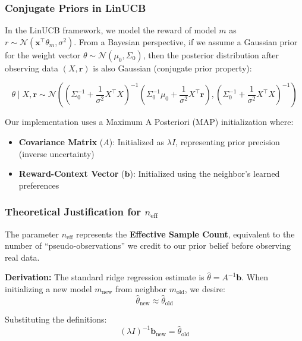 \documentclass[sigconf,nonacm]{acmart}
\begin{document}
\subsubsection{Conjugate Priors in LinUCB}

In the LinUCB framework, we model the reward of model $m$ as $r \sim \mathcal{N}(\mathbf{x}^\top \theta_m, \sigma^2)$. From a Bayesian perspective, if we assume a Gaussian prior for the weight vector $\theta \sim \mathcal{N}(\mu_0, \Sigma_0)$, then the posterior distribution after observing data $(X, \mathbf{r})$ is also Gaussian (conjugate prior property):

\begin{equation}
\theta \mid X, \mathbf{r} \sim \mathcal{N}\left( \left(\Sigma_0^{-1} + \frac{1}{\sigma^2} X^\top X\right)^{-1} \left(\Sigma_0^{-1}\mu_0 + \frac{1}{\sigma^2} X^\top \mathbf{r}\right), \left(\Sigma_0^{-1} + \frac{1}{\sigma^2} X^\top X\right)^{-1} \right)
\end{equation}

Our implementation uses a Maximum A Posteriori (MAP) initialization where:
\begin{itemize}
    \item \textbf{Covariance Matrix} ($A$): Initialized as $\lambda I$, representing prior precision (inverse uncertainty)
    \item \textbf{Reward-Context Vector} ($\mathbf{b}$): Initialized using the neighbor's learned preferences
\end{itemize}

\subsubsection{Theoretical Justification for $n_{\text{eff}}$}

The parameter $n_{\text{eff}}$ represents the \textbf{Effective Sample Count}, equivalent to the number of ``pseudo-observations'' we credit to our prior belief before observing real data.

\textbf{Derivation:} The standard ridge regression estimate is $\hat{\theta} = A^{-1}\mathbf{b}$. When initializing a new model $m_{\text{new}}$ from neighbor $m_{\text{old}}$, we desire:
\begin{equation}
\hat{\theta}_{\text{new}} \approx \hat{\theta}_{\text{old}}
\end{equation}

Substituting the definitions:
\begin{equation}
(\lambda I)^{-1} \mathbf{b}_{\text{new}} = \hat{\theta}_{\text{old}}
\end{equation}
\end{document}
